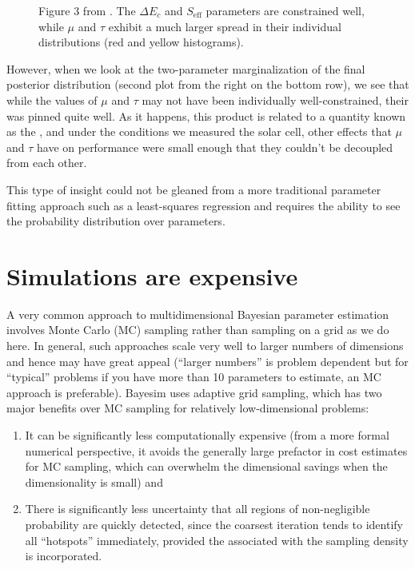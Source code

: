 \documentclass[letterpaper,10pt,english]{sphinxmanual}
\begin{document}
\begin{figure}[htbp]
\centering
\capstart

\noindent{}
\caption{Figure 3 from . The \(\Delta E_c\) and \(S_\text{eff}\) parameters are constrained well, while \(\mu\) and \(\tau\) exhibit a much larger spread in their individual distributions (red and yellow histograms).}\label{\detokenize{whybayesim:id1}}\end{figure}

However, when we look at the two-parameter marginalization of the final posterior distribution (second plot from the right on the bottom row), we see that while the values of \(\mu\) and \(\tau\) may not have been individually well-constrained, their  was pinned quite well. As it happens, this product is related to a quantity known as the , and under the conditions we measured the solar cell, other effects that \(\mu\) and \(\tau\) have on performance were small enough that they couldn’t be decoupled from each other.

This type of insight could not be gleaned from a more traditional parameter fitting approach such as a least-squares regression and requires the ability to see the probability distribution over parameters.


\section{Simulations are expensive}
\label{\detokenize{whybayesim:simulations-are-expensive}}
A very common approach to multidimensional Bayesian parameter estimation involves Monte Carlo (MC) sampling rather than sampling on a grid as we do here. In general, such approaches scale very well to larger numbers of dimensions and hence may have great appeal (“larger numbers” is problem dependent but for “typical” problems if you have more than 10 parameters to estimate, an MC approach is preferable). Bayesim uses adaptive grid sampling, which has two major benefits over MC sampling for relatively low-dimensional problems:
\begin{enumerate}
\item {}
It can be significantly less computationally expensive (from a more formal numerical perspective, it avoids the generally large prefactor in cost estimates for MC sampling, which can overwhelm the dimensional savings when the dimensionality is small) and

\item {}
There is significantly less uncertainty that all regions of non-negligible probability are quickly detected, since the coarsest iteration tends to identify all “hotspots” immediately, provided the {\hyperref[\detokenize{bayesics:model-uncertainty}]{}} associated with the sampling density is incorporated.

\end{enumerate}
\end{document}
